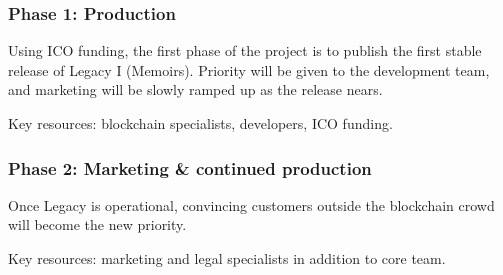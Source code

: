 \subsubsection*{Phase 1: Production} %
\label{ssub:phase_1_production}
Using ICO funding, the first phase of the project is to publish the first stable release of Legacy I (Memoirs). Priority will be given to the development team, and marketing will be slowly ramped up as the release nears.

Key resources: blockchain specialists, developers, ICO funding.


\subsubsection{Phase 2: Marketing \& continued production} %
\label{ssub:phase_2_marketing_continued_production}
Once Legacy is operational, convincing customers outside the blockchain crowd will become the new priority.

Key resources: marketing and legal specialists in addition to core team.



